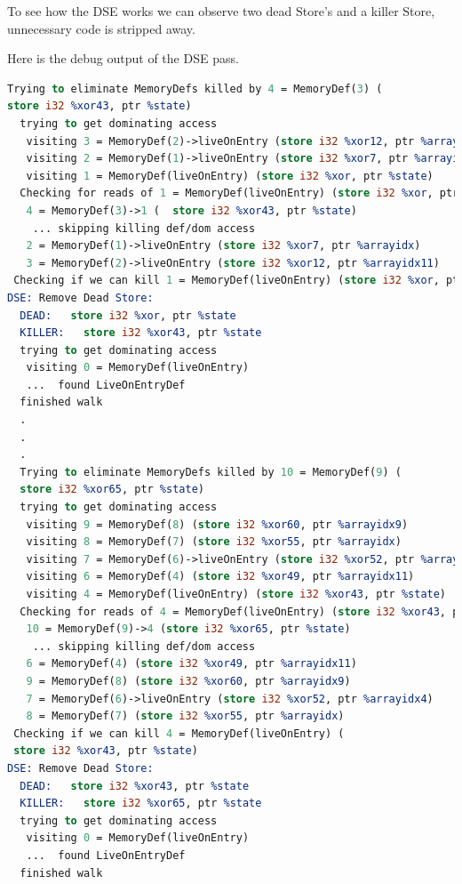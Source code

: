 

To see how the DSE works we can observe two dead Store's and a killer Store, unnecessary code is stripped away.



Here is the debug output of the DSE pass.

\begin{lstlisting}[language=llvm, style=nasm]
Trying to eliminate MemoryDefs killed by 4 = MemoryDef(3) (
store i32 %xor43, ptr %state)
  trying to get dominating access
   visiting 3 = MemoryDef(2)->liveOnEntry (store i32 %xor12, ptr %arrayidx11)
   visiting 2 = MemoryDef(1)->liveOnEntry (store i32 %xor7, ptr %arrayidx)
   visiting 1 = MemoryDef(liveOnEntry) (store i32 %xor, ptr %state)
  Checking for reads of 1 = MemoryDef(liveOnEntry) (store i32 %xor, ptr %state)
   4 = MemoryDef(3)->1 (  store i32 %xor43, ptr %state)
    ... skipping killing def/dom access
   2 = MemoryDef(1)->liveOnEntry (store i32 %xor7, ptr %arrayidx)
   3 = MemoryDef(2)->liveOnEntry (store i32 %xor12, ptr %arrayidx11)
 Checking if we can kill 1 = MemoryDef(liveOnEntry) (store i32 %xor, ptr %state)
DSE: Remove Dead Store:
  DEAD:   store i32 %xor, ptr %state
  KILLER:   store i32 %xor43, ptr %state
  trying to get dominating access
   visiting 0 = MemoryDef(liveOnEntry)
   ...  found LiveOnEntryDef
  finished walk
  .
  .
  .
  Trying to eliminate MemoryDefs killed by 10 = MemoryDef(9) (
  store i32 %xor65, ptr %state)
  trying to get dominating access
   visiting 9 = MemoryDef(8) (store i32 %xor60, ptr %arrayidx9)
   visiting 8 = MemoryDef(7) (store i32 %xor55, ptr %arrayidx)
   visiting 7 = MemoryDef(6)->liveOnEntry (store i32 %xor52, ptr %arrayidx4)
   visiting 6 = MemoryDef(4) (store i32 %xor49, ptr %arrayidx11)
   visiting 4 = MemoryDef(liveOnEntry) (store i32 %xor43, ptr %state)
  Checking for reads of 4 = MemoryDef(liveOnEntry) (store i32 %xor43, ptr %state)
   10 = MemoryDef(9)->4 (store i32 %xor65, ptr %state)
    ... skipping killing def/dom access
   6 = MemoryDef(4) (store i32 %xor49, ptr %arrayidx11)
   9 = MemoryDef(8) (store i32 %xor60, ptr %arrayidx9)
   7 = MemoryDef(6)->liveOnEntry (store i32 %xor52, ptr %arrayidx4)
   8 = MemoryDef(7) (store i32 %xor55, ptr %arrayidx)
 Checking if we can kill 4 = MemoryDef(liveOnEntry) (
 store i32 %xor43, ptr %state)
DSE: Remove Dead Store:
  DEAD:   store i32 %xor43, ptr %state
  KILLER:   store i32 %xor65, ptr %state
  trying to get dominating access
   visiting 0 = MemoryDef(liveOnEntry)
   ...  found LiveOnEntryDef
  finished walk
\end{lstlisting}

